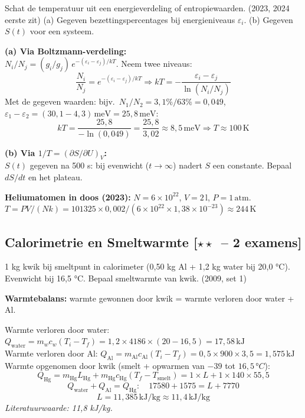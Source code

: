 \documentclass[10pt,a4paper]{article}
\begin{document}
\begin{oefening}{Schat de temperatuur uit een energieverdeling of entropiewaarden. \textnormal{(2023, 2024 eerste zit)}}
(a) Gegeven bezettingspercentages bij energieniveaus $\varepsilon_i$. (b) Gegeven $S(t)$ voor een systeem.
\end{oefening}

\begin{oplossing}
\textbf{(a) Via Boltzmann-verdeling:}\\
$N_i/N_j = (g_i/g_j)\,e^{-(\varepsilon_i-\varepsilon_j)/kT}$. Neem twee niveaus:
$$\frac{N_i}{N_j} = e^{-(\varepsilon_i-\varepsilon_j)/kT} \Rightarrow kT = -\frac{\varepsilon_i-\varepsilon_j}{\ln(N_i/N_j)}$$
Met de gegeven waarden: bijv.\ $N_1/N_2 = 3{,}1\%/63\% = 0{,}049$, $\varepsilon_1 - \varepsilon_2 = (30{,}1-4{,}3)\,\text{meV} = 25{,}8\,\text{meV}$:
$$kT = \frac{25{,}8}{-\ln(0{,}049)} = \frac{25{,}8}{3{,}02} \approx 8{,}5\,\text{meV} \Rightarrow T \approx 100\,\text{K}$$

\textbf{(b) Via $1/T = (\partial S/\partial U)_V$:}\\
$S(t)$ gegeven na 500 s: bij evenwicht ($t\to\infty$) nadert $S$ een constante. Bepaal $dS/dt$ en het plateau.

\textbf{Heliumatomen in doos (2023):} $N = 6\times10^{22}$, $V = 2\,\text{l}$, $P = 1\,\text{atm}$.
$T = PV/(Nk) = 101325\times 0{,}002/(6\times10^{22}\times1{,}38\times10^{-23}) \approx 244\,\text{K}$
\end{oplossing}

\subsection{Calorimetrie en Smeltwarmte \textnormal{\color{warningred}[$\star\star$\ -- 2 examens]}}

\begin{oefening}{1 kg kwik bij smeltpunt in calorimeter (0,50 kg Al + 1,2 kg water bij 20,0 °C). Evenwicht bij 16,5 °C. Bepaal smeltwarmte van kwik. \textnormal{(2009, set 1)}}
\end{oefening}

\begin{oplossing}
\textbf{Warmtebalans:} warmte gewonnen door kwik = warmte verloren door water + Al.

Warmte verloren door water: $Q_\text{water} = m_w c_w (T_i - T_f) = 1{,}2\times4186\times(20-16{,}5) = 17{,}58\,\text{kJ}$\\
Warmte verloren door Al: $Q_\text{Al} = m_\text{Al}c_\text{Al}(T_i-T_f) = 0{,}5\times900\times3{,}5 = 1{,}575\,\text{kJ}$\\
Warmte opgenomen door kwik (smelt + opwarmen van $-39$ tot $16{,}5\,°C$):
$$Q_\text{Hg} = m_\text{Hg}L_\text{Hg} + m_\text{Hg}c_\text{Hg}(T_f - T_\text{smelt}) = 1\times L + 1\times140\times55{,}5$$
$$Q_\text{water} + Q_\text{Al} = Q_\text{Hg}: \quad 17580 + 1575 = L + 7770$$
$$L = 11{,}385\,\text{kJ/kg} \approx 11{,}4\,\text{kJ/kg}$$
\textit{Literatuurwaarde: 11,8 kJ/kg. }
\end{oplossing}
\end{document}

